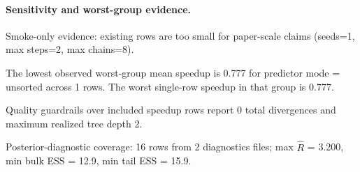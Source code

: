 \paragraph{Sensitivity and worst-group evidence.}
Smoke-only evidence: existing rows are too small for paper-scale claims (seeds=1, max steps=2, max chains=8).

The lowest observed worst-group mean speedup is 0.777 for predictor mode = unsorted across 1 rows. The worst single-row speedup in that group is 0.777.

Quality guardrails over included speedup rows report 0 total divergences and maximum realized tree depth 2.

Posterior-diagnostic coverage: 16 rows from 2 diagnostics files; max $\widehat{R}$ = 3.200, min bulk ESS = 12.9, min tail ESS = 15.9.



